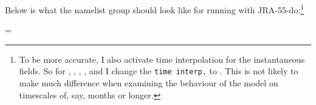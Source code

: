 Below is what the  namelist group should look like for running with \mbox{JRA-55-do}:\footnote{
    To be more accurate, I also activate time interpolation for the instantaneous fields.
    So for , , , , and  I change the \texttt{time interp.} to \nmltrue{}.
    This is not likely to make much difference when examining the behaviour of the model on timescales of, say, months or longer.
}

\begingroup\tiny\centering
\begin{VerbatimNML}[samepage=true]
\nmlcomment[]{!-----------------------------------------------------------------------}
    
\nmlcomment[]{!-----------------------------------------------------------------------}
       = \nmltrue{}     


\end{VerbatimNML}
